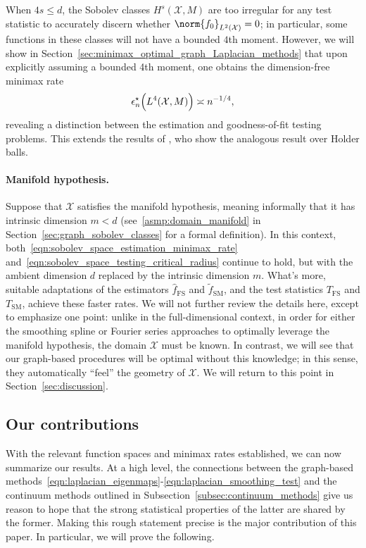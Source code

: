 \documentclass{article}
\newcommand{\1}{\mathbf{1}}
\newcommand{\Xset}{\mathcal{X}}
\newcommand{\Leb}{L}
\newcommand{\mc}[1]{\mathcal{#1}}
\newcommand{\wt}[1]{\widetilde{#1}}
\newcommand{\wh}[1]{\widehat{#1}}
\newcommand{\SM}{\mathrm{SM}}
\newcommand{\OS}{\mathrm{FS}}
\theoremstyle{alden}
\theoremstyle{aldenthm}
\theoremstyle{definition}
\theoremstyle{remark}
\begin{document}
When $4s \leq d$, the Sobolev classes $H^s(\Xset,M)$ are too irregular for any test statistic to accurately discern whether $\norm{f_0}_{\Leb^2(\Xset)} = 0$; in particular, some functions in these classes will not have a bounded $4$th moment. However, we will show in Section~\ref{sec:minimax_optimal_graph_Laplacian_methods} that upon explicitly assuming a bounded 4th moment, one obtains the dimension-free minimax rate
\begin{equation*}
\epsilon_n^{\star}\Bigl(\Leb^4(\mc{X},M)\Bigr) \asymp n^{-1/4},
\end{equation*}
revealing a distinction between the estimation and goodness-of-fit testing problems. This extends the results of \cite{guerre02}, who show the analogous result over Holder balls.

\paragraph{Manifold hypothesis.}

Suppose that $\Xset$ satisfies the manifold hypothesis, meaning informally that it has intrinsic dimension $m < d$ (see~\ref{asmp:domain_manifold} in Section~\ref{sec:graph_sobolev_classes} for a formal definition). In this context, both~\eqref{eqn:sobolev_space_estimation_minimax_rate} and~\eqref{eqn:sobolev_space_testing_critical_radius} continue to hold, but with the ambient dimension $d$ replaced by the intrinsic dimension $m$. What's more, suitable adaptations of the estimators $\wh{f}_{\OS}$ and $\wt{f}_{\SM}$, and the test statistics $T_{\OS}$ and $T_{\SM}$, achieve these faster rates. We will not further review the details here, except to emphasize one point: unlike in the full-dimensional context, in order for either the smoothing spline or Fourier series approaches to optimally leverage the manifold hypothesis, the domain $\Xset$ must be known. In contrast, we will see that our graph-based procedures will be optimal without this knowledge; in this sense, they automatically ``feel'' the geometry of $\Xset$. We will return to this point in Section~\ref{sec:discussion}.

\subsection{Our contributions}
\label{subsec:our_contributions}

With the relevant function spaces and minimax rates established, we can now summarize our results. At a high level, the connections between the graph-based methods~\eqref{eqn:laplacian_eigenmaps}-\eqref{eqn:laplacian_smoothing_test} and the continuum methods outlined in Subsection~\ref{subsec:continuum_methods} give us reason to hope that the strong statistical properties of the latter are shared by the former. Making this rough statement precise is the major contribution of this paper. In particular, we will prove the following.
\end{document}
